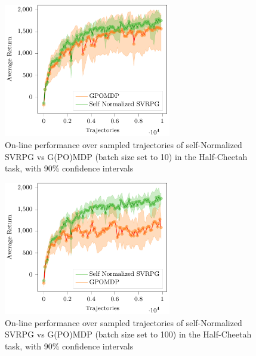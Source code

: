 \begin{figure}[h]
	\begin{minipage}[h]{1\textwidth}
		\centering
		\includegraphics[width=0.65\textwidth]{Images/Experiments/half_cheetah_Self_Normalized_SVRPG_vs_GPOMDP.pdf}
		\vspace{-0.1in}
		\caption{On-line performance over sampled trajectories of self-Normalized \acs{SVRPG} vs G(PO)MDP (batch size set to 10) in the Half-Cheetah task, with 90\% confidence intervals}
		\label{fig:hcone}
	\end{minipage}
	\vspace{-0.15in}
\end{figure}
\begin{figure}[h]
	\begin{minipage}[h]{1\textwidth}
		\centering
		\includegraphics[width=0.65\textwidth]{Images/Experiments/half_cheetah_GPOMDP_100_vs_SN_SVRPG.pdf}
		\vspace{-0.1in}
		\caption{On-line performance over sampled trajectories of self-Normalized \acs{SVRPG} vs G(PO)MDP (batch size set to 100) in the Half-Cheetah task, with 90\% confidence intervals}
		\label{fig:hc100}
	\end{minipage}
	\vspace{-0.15in}
\end{figure}
